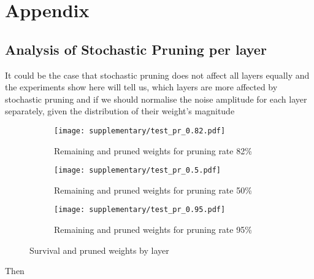 \section{ Appendix}
\subsection{Analysis of Stochastic Pruning per layer}

It could be the case that  stochastic pruning does not affect  all layers equally and the experiments show here  will tell us, which layers are more affected by stochastic pruning and if we should normalise the noise amplitude for each layer separately, given the distribution of their weight's magnitude

\begin{figure}[htpb]
    \begin{subfigure}{\textwidth}
    \texttt{[image: supplementary/test\_pr\_0.82.pdf]}
    \caption{Remaining and pruned weights for pruning rate 82\%}
    \label{subfig:pr_0.82}
    \end{subfigure}
    \hfill
    \begin{subfigure}{\textwidth}
    \texttt{[image: supplementary/test\_pr\_0.5.pdf]}
    \label{subfig:pr_0.5}
    \caption{Remaining and pruned weights for pruning rate 50\%}
    \end{subfigure}
    \hfill
    \begin{subfigure}{\textwidth}
    \texttt{[image: supplementary/test\_pr\_0.95.pdf]}
    \caption{Remaining and pruned weights for pruning rate 95\%}
    \label{subfig:pr_0.95}
    \end{subfigure}
    \hfill
    \caption{Survival and pruned weights by layer}
\end{figure}
Then
